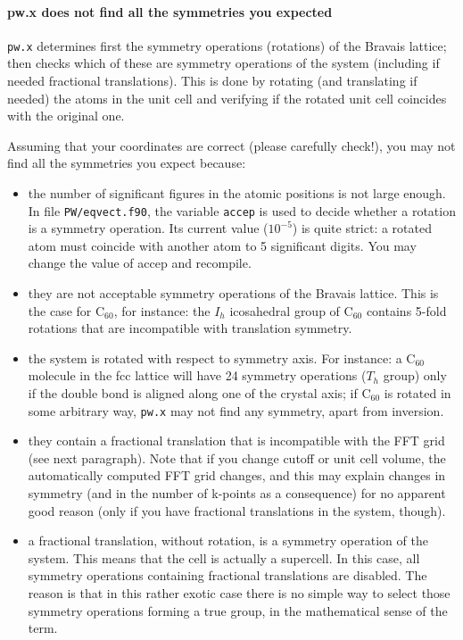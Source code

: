 \documentclass[12pt,a4paper]{article}
\def\pw.x{\texttt{pw.x}}
\begin{document}
\paragraph{pw.x does not find all the symmetries you expected} 
\pw.x determines first the symmetry operations (rotations) of the
Bravais lattice; then checks which of these are symmetry operations of
the system (including if needed fractional translations). This is done
by rotating (and translating if needed) the atoms in the unit cell and
verifying if the rotated unit cell coincides with the original one.

Assuming that your coordinates are correct (please carefully check!),
you may not find all the symmetries you expect because:
\begin{itemize}
\item the number of significant figures in the atomic positions is not
  large enough. In file \texttt{PW/eqvect.f90}, the variable \texttt{accep} is used to
  decide whether a rotation is a symmetry operation. Its current value
  ($10^{-5}$) is quite strict: a rotated atom must coincide with
  another atom to 5 significant digits. You may change the value of
  accep and recompile. 
\item they are not acceptable symmetry operations of the Bravais
  lattice. This is the case for C$_{60}$, for instance: the $I_h$
  icosahedral group of C$_{60}$ contains 5-fold rotations that are
  incompatible with translation symmetry.  
\item  the system is rotated with respect to symmetry axis. For
  instance: a C$_{60}$ molecule in the fcc lattice will have 24
  symmetry operations ($T_h$ group) only if the double bond is
  aligned along one of the crystal axis; if C$_{60}$ is rotated
  in some arbitrary way, \pw.x may not find any symmetry, apart from
  inversion. 
\item they contain a fractional translation that is incompatible with
  the FFT grid (see next paragraph). Note that if you change cutoff or
  unit cell volume, the automatically computed FFT grid changes, and
  this may explain changes in symmetry (and in the number of k-points
  as a consequence) for no apparent good reason (only if you have
  fractional translations in the system, though). 
\item a fractional translation, without rotation, is a symmetry
  operation of the system. This means that the cell is actually a
  supercell. In this case, all symmetry operations containing
  fractional translations are disabled. The reason is that in this
  rather exotic case there is no simple way to select those symmetry
  operations forming a true group, in the mathematical sense of the
  term. 
\end{itemize}
\end{document}
